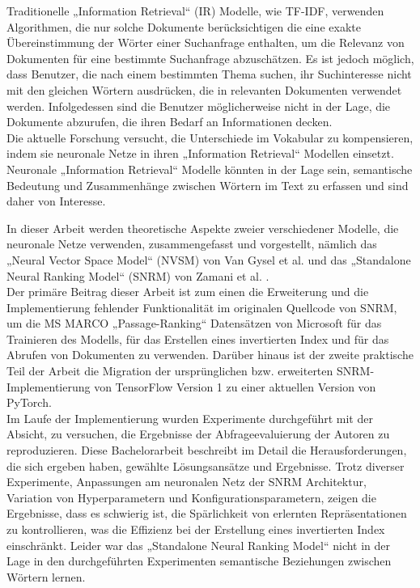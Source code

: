 \documentclass[draft,final]{vutinfth} %
\begin{document}
\begin{kurzfassung}
Traditionelle „Information Retrieval“ (IR) Modelle, wie TF-IDF, verwenden Algorithmen, 
    die nur solche Dokumente berücksichtigen die eine exakte Übereinstimmung der 
    Wörter einer Suchanfrage enthalten, 
    um die Relevanz von Dokumenten für eine bestimmte Suchanfrage abzuschätzen.
Es ist jedoch möglich, dass Benutzer, die nach einem bestimmten Thema suchen, 
    ihr Suchinteresse nicht mit den gleichen Wörtern ausdrücken, 
    die in relevanten Dokumenten verwendet werden.
Infolgedessen sind die Benutzer möglicherweise nicht in der Lage, die Dokumente abzurufen, 
    die ihren Bedarf an Informationen decken.\\
Die aktuelle Forschung versucht, die Unterschiede im Vokabular zu kompensieren, 
    indem sie neuronale Netze in ihren „Information Retrieval“ Modellen einsetzt.
Neuronale „Information Retrieval“ Modelle könnten in der Lage sein, semantische Bedeutung 
    und Zusammenhänge zwischen Wörtern im Text zu erfassen und sind daher von Interesse.

In dieser Arbeit werden theoretische Aspekte zweier verschiedener Modelle, die 
    neuronale Netze verwenden, zusammengefasst und vorgestellt, 
    nämlich das „Neural Vector Space Model“ (NVSM) von Van Gysel et al. 
    \cite{van-gysel:2017:neural-vector-spaces} und 
    das „Standalone Neural Ranking Model“ (SNRM) von Zamani et al.
    \cite{zamani:2018:from-neural-reranking-to-neural-ranking}.\\
Der primäre Beitrag dieser Arbeit ist zum einen die Erweiterung und die
    Implementierung fehlender Funktionalität im originalen Quellcode von SNRM, 
    um die MS MARCO „Passage-Ranking“ Datensätzen von Microsoft
    für das Trainieren des Modells, für das Erstellen eines invertierten Index 
    und für das Abrufen von Dokumenten zu verwenden.
Darüber hinaus ist der zweite praktische Teil der Arbeit die Migration der 
    ursprünglichen bzw. erweiterten SNRM-Implementierung 
    von TensorFlow Version 1 zu einer aktuellen Version von PyTorch.\\
Im Laufe der Implementierung wurden Experimente durchgeführt mit der Absicht, 
    zu versuchen, die Ergebnisse der Abfrageevaluierung der Autoren zu reproduzieren.
Diese Bachelorarbeit beschreibt im Detail die Herausforderungen, 
    die sich ergeben haben, gewählte Lösungsansätze und Ergebnisse.
Trotz diverser Experimente, Anpassungen am neuronalen Netz der SNRM Architektur, 
    Variation von Hyperparametern und Konfigurationsparametern,
    zeigen die Ergebnisse, dass es schwierig ist, die 
    Spärlichkeit von erlernten Repräsentationen zu kontrollieren, 
    was die Effizienz bei der Erstellung eines invertierten Index einschränkt.
Leider war das „Standalone Neural Ranking Model“ nicht in der Lage 
    in den durchgeführten Experimenten semantische Beziehungen zwischen Wörtern lernen.
\end{kurzfassung}
\end{document}
